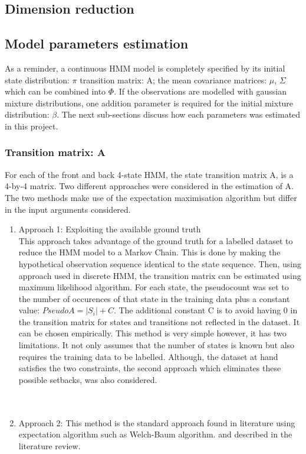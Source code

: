 \subsection{Dimension reduction}

\subsection{Model parameters estimation}
As a reminder, a continuous HMM model is completely specified by its initial state distribution: \(\pi\) transition matrix: A; the mean covariance matrices: \(\mu\), \(\Sigma\) which can be combined into \(\Phi\). If the observations are modelled with gaussian mixture distributions, one addition parameter is required for the initial mixture distribution: \(\beta\). The next sub-sections discuss how each parameters was estimated in this project.

\subsubsection{Transition matrix: A}
For each of the front and back 4-state HMM, the state transition matrix A, is a 4-by-4 matrix. Two different approaches were considered in the estimation of A. The two methods make use of the expectation maximisation algorithm %
but differ in the input arguments considered.

\begin{enumerate}
	\item Approach 1: Exploiting the available ground truth\\
	This approach takes advantage of the ground truth for a labelled dataset to reduce the HMM model to a Markov Chain. This is done by making the hypothetical observation sequence identical to the state sequence. Then, using approach used in discrete HMM, %
	the transition matrix can be estimated using maximum likelihood algorithm. %
	For each state, the pseudocount was set to the number of occurences of that state in the training data plus a constant value: \(PseudoA = |S_i| + C\). The additional constant C is to avoid having 0 in the transition matrix for states and transitions not reflected in the dataset. It can be chosen empirically.
	This method is very simple however, it has two limitations. It not only assumes that the number of states is known but also requires the training data to be labelled. Although, the dataset at hand satisfies the two constraints, the second approach which eliminates these possible setbacks, was also considered. \\\\\
	
	\item Approach 2: This method is the standard approach found in literature using expectation algorithm such as Welch-Baum algorithm. %
	and described in the literature review. %
\end{enumerate}


